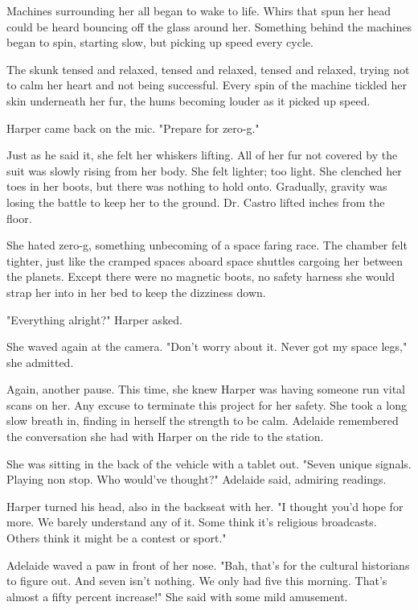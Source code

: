 Machines surrounding her all began to wake to life. Whirs that spun her head could be heard bouncing off the glass around her. Something behind the machines began to spin, starting slow, but picking up speed every cycle.

The skunk tensed and relaxed, tensed and relaxed, tensed and relaxed, trying not to calm her heart and not being successful. Every spin of the machine tickled her skin underneath her fur, the hums becoming louder as it picked up speed.

Harper came back on the mic. "Prepare for zero-g."

Just as he said it, she felt her whiskers lifting. All of her fur not covered by the suit was slowly rising from her body. She felt lighter; too light. She clenched her toes in her boots, but there was nothing to hold onto. Gradually, gravity was losing the battle to keep her to the ground. Dr. Castro lifted inches from the floor.

She hated zero-g, something unbecoming of a space faring race. The chamber felt tighter, just like the cramped spaces aboard space shuttles cargoing her between the planets. Except there were no magnetic boots, no safety harness she would strap her into in her bed to keep the dizziness down.

"Everything alright?" Harper asked.

She waved again at the camera. "Don't worry about it. Never got my space legs," she admitted.

Again, another pause. This time, she knew Harper was having someone run vital scans on her. Any excuse to terminate this project for her safety. She took a long slow breath in, finding in herself the strength to be calm. Adelaide remembered the conversation she had with Harper on the ride to the station.

\secdiv

She was sitting in the back of the vehicle with a tablet out. "Seven unique signals. Playing non stop. Who would've thought?" Adelaide said, admiring readings.

Harper turned his head, also in the backseat with her. "I thought you'd hope for more. We barely understand any of it. Some think it's religious broadcasts. Others think it might be a contest or sport."

Adelaide waved a paw in front of her nose. "Bah, that's for the cultural historians to figure out. And seven isn't nothing. We only had five this morning. That's almost a fifty percent increase!" She said with some mild amusement.

